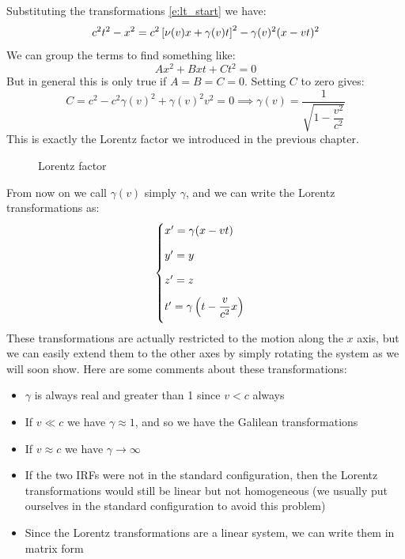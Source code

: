 Substituting the transformations \eqref{e:lt_start} we have:
\begin{equation}
  c^2 t^2 - x^2 = c^2 \left[\nu(v)x + \gamma(v)t\right]^2 - \gamma(v)^2(x - vt)^2
\end{equation}
We can group the terms to find something like:
\begin{equation}
  Ax^2 + Bxt + Ct^2 = 0
\end{equation}
But in general this is only true if $A=B=C=0$. Setting $C$ to zero gives:
\begin{equation}
  C = c^2 - c^2\gamma(v)^2 + \gamma(v)^2v^2 = 0 \implies \gamma(v) = \dfrac{1}{\sqrt{1 - \dfrac{v^2}{c^2}}}
\end{equation}
This is exactly the Lorentz factor we introduced in the previous chapter.
\begin{figure}[H]
  \centering
  
  \caption{Lorentz factor}
\end{figure}
From now on we call $\gamma(v)$ simply $\gamma$, and we can write the Lorentz transformations as:
\begin{equation} \label{e:lt}
  \begin{cases}
    x' = \gamma(x - vt) \\[8pt]
    y'=y \\[8pt]
    z'=z \\[8pt]
    t' = \gamma\left(t - \dfrac{v}{c^2}x\right) \\[8pt]
  \end{cases}
\end{equation}
These transformations are actually restricted to the motion along the $x$ axis, but we can easily extend them to the other axes by simply rotating the system as we will soon show. Here are some comments about these transformations:
\begin{itemize}
  \item $\gamma$ is always real and greater than 1 since $v<c$ always
  \item If $v \ll c$ we have $\gamma \approx 1$, and so we have the Galilean transformations
  \item If $v \approx c$ we have $\gamma \rightarrow \infty$
  \item If the two IRFs were not in the standard configuration, then the Lorentz transformations would still be linear but not homogeneous (we usually put ourselves in the standard configuration to avoid this problem)
  \item Since the Lorentz transformations are a linear system, we can write them in matrix form
\end{itemize}
